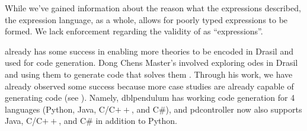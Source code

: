 While we've gained information about the reason what the expressions described,
the expression language, as a whole, allows for poorly typed expressions to be
formed. We lack enforcement regarding the validity of \Expr{} as
``expressions''.

\ModelKind{} already has some success in enabling more theories to be encoded in
Drasil and used for code generation. Dong Chens Master's involved exploring
\acsp{ode} in Drasil and using them to generate code that solves them
\cite{Chen2022MEng}. Through his work, we have already observed some success
because more case studies are already capable of generating code (see
). Namely, \acs{dblpendulum} has working
code generation for 4 languages (Python, Java, C/C\(++\), and C\#), and
\acs{pdcontroller} now also supports Java, C/C\(++\), and C\# in addition to
Python.

\caseStudiesCodeTableAfterDongsWork{}
